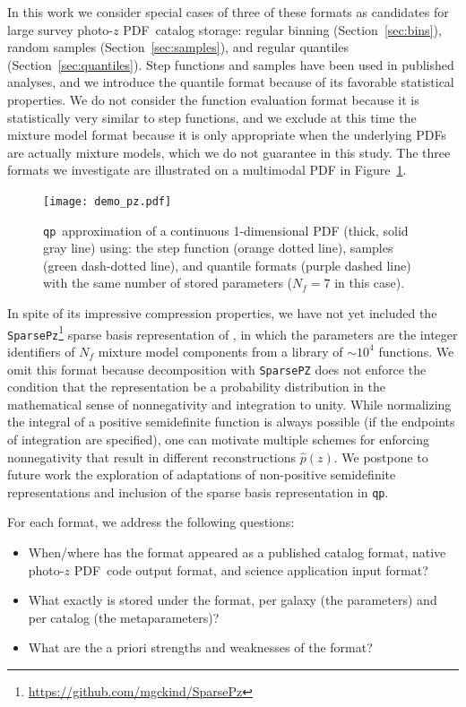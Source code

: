 \documentclass[\docopts]{\docclass}
\newcommand{\qp}{\texttt{qp}}
\newcommand{\pz}{photo-$z$ PDF}
\begin{document}
In this work we consider special cases of three of these formats as candidates 
for large survey \pz\ catalog storage: regular binning 
(Section~\ref{sec:bins}), random samples (Section~\ref{sec:samples}), and 
regular quantiles (Section~\ref{sec:quantiles}).
Step functions and samples have been used in published analyses, and we 
introduce the quantile format because of its favorable statistical properties.
We do not consider the function evaluation format because it is statistically 
very similar to step functions, and we exclude at this time the mixture model 
format because it is only appropriate when the underlying PDFs are actually 
mixture models, which we do not guarantee in this study.
The three formats we investigate are illustrated on a multimodal PDF in 
Figure~\ref{fig:qp}.
\begin{figure}
  \begin{center}
    \texttt{[image: demo\_pz.pdf]}
    \caption{\qp\ approximation of a continuous 1-dimensional PDF (thick, solid 
gray line) using: the step function (orange dotted line), samples (green 
dash-dotted line), and quantile formats (purple dashed line) with the same 
number of stored parameters ($N_{f}=7$ in this case).
    \label{fig:qp}}
  \end{center}
\end{figure}

In spite of its impressive compression properties, we have not yet included the 
\texttt{SparsePz}\footnote{\url{https://github.com/mgckind/SparsePz}} sparse 
basis representation of \citet{carrasco_kind_sparse_2014}, in which the 
parameters are the integer identifiers of $N_{f}$ mixture model components from 
a library of $\sim10^{4}$ functions.
We omit this format because decomposition with \texttt{SparsePZ} does not 
enforce the condition that the representation be a probability distribution in 
the mathematical sense of nonnegativity and integration to unity.
While normalizing the integral of a positive semidefinite function is always 
possible (if the endpoints of integration are specified), one can motivate 
multiple schemes for enforcing nonnegativity that result in different 
reconstructions $\hat{p}(z)$.
We postpone to future work the exploration of adaptations of non-positive 
semidefinite representations and inclusion of the sparse basis representation 
in \qp.

For each format, we address the following questions:
\begin{itemize}[partopsep=0pt, parsep=0pt, itemsep=5pt]
  \item When/where has the format appeared as a published catalog format, 
native \pz\ code output format, and science application input format?
  \item What exactly is stored under the format, per galaxy (the parameters) 
and per catalog (the metaparameters)?
  \item What are the a priori strengths and weaknesses of the format?
\end{itemize}
\end{document}
